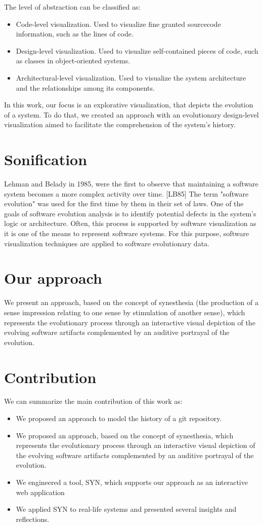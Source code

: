 The level of abstraction can be classified as:
\begin{itemize}
	\item Code-level visualization. Used to visualize fine granted sourcecode information, such as the lines of code. 
	\item Design-level visualization. Used to visualize self-contained pieces of code, such as classes in object-oriented systems. 
	\item Architectural-level visualization. Used to visualize the system architecture and the relationships among its components. 
\end{itemize}


In this work, our focus is an explorative visualization, that depicts the evolution of a system. To do that, we created an approach with an evolutionary design-level visualization aimed to facilitate the comprehension of the system's history. 

\section{Sonification}
Lehman and Belady in 1985, were the first to observe that maintaining a software system becomes a more complex activity over time. [LB85] 
The term "software evolution" was used for the first time by them in their set of laws. 
One of the goals of software evolution analysis is to identify potential defects in the system's logic or architecture. 
Often, this process is supported by software visualization as it is one of the means to represent software systems. 
For this purpose, software visualization techniques are applied to software evolutionary data. 

\section{Our approach}
We present an approach, based on the concept of synesthesia (the production of a sense impression relating to one sense by stimulation of another sense), which represents the evolutionary process through an interactive visual depiction of the evolving software artifacts complemented by an auditive portrayal of the evolution.

\section{Contribution}
We can summarize the main contribution of this work as:
\begin{itemize}
 \item We proposed an approach to model the history of a git repository.
 \item We proposed an approach,  based on the concept of synesthesia, which represents the evolutionary process through an interactive visual depiction of the evolving software artifacts complemented by an auditive portrayal of the evolution.
 \item We engineered a tool, SYN, which supports our approach as an interactive web application
 \item We applied SYN to real-life systems and presented several insights and reflections. 
\end{itemize}

